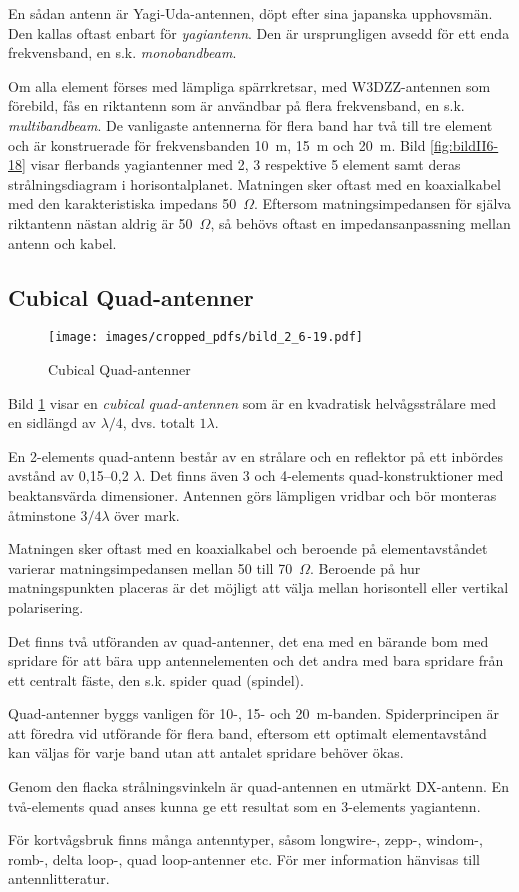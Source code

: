 En sådan antenn är Yagi-Uda-antennen, döpt efter sina japanska upphovsmän.
Den kallas oftast enbart för \emph{yagiantenn}.
Den är ursprungligen avsedd för ett enda frekvensband, en s.k.
\emph{monobandbeam}.

Om alla element förses med lämpliga spärrkretsar, med W3DZZ-antennen som
förebild, fås en riktantenn som är användbar på flera frekvensband, en s.k.
\emph{multibandbeam}.
De vanligaste antennerna för flera band har två till tre element och är
konstruerade för frekvensbanden 10~m, 15~m och 20~m.
Bild \ref{fig:bildII6-18} visar flerbands yagiantenner med 2, 3 respektive 5
element samt deras strålningsdiagram i horisontalplanet.
Matningen sker oftast med en koaxialkabel med den karakteristiska impedans 50~\(\Omega\).
Eftersom matningsimpedansen för själva riktantenn nästan aldrig är
50~\(\Omega\), så behövs oftast en impedansanpassning mellan antenn och kabel.

\subsection{Cubical Quad-antenner}

\begin{figure}
  \texttt{[image: images/cropped\_pdfs/bild\_2\_6-19.pdf]}
  \caption{Cubical Quad-antenner}
  \label{fig:bildII6-19}
\end{figure}

Bild \ref{fig:bildII6-19} visar en \emph{cubical quad-antennen} som är en
kvadratisk helvågsstrålare med en sidlängd av \(\lambda/4\), dvs. totalt
\(1\lambda\).

En 2-elements quad-antenn består av en strålare och en reflektor på
ett inbördes avstånd av 0,15--0,2 \(\lambda\).
Det finns även 3 och 4-elements quad-konstruktioner med beaktansvärda
dimensioner.
Antennen görs lämpligen vridbar och bör monteras åtminstone \(3/4 \lambda\)
över mark.

Matningen sker oftast med en koaxialkabel och beroende på elementavståndet
varierar matningsimpedansen mellan 50 till 70~\(\Omega\).
Beroende på hur matningspunkten placeras är det möjligt att välja mellan
horisontell eller vertikal polarisering.

Det finns två utföranden av quad-antenner, det ena med en bärande bom
med spridare för att bära upp antennelementen och det andra med bara
spridare från ett centralt fäste, den s.k. spider quad (spindel).

Quad-antenner byggs vanligen för 10-, 15- och 20~m-banden.
Spiderprincipen är att föredra vid utförande för flera band, eftersom ett
optimalt elementavstånd kan väljas för varje band utan att antalet spridare
behöver ökas.

Genom den flacka strålningsvinkeln är quad-antennen en utmärkt DX-antenn.
En två-elements quad anses kunna ge ett resultat som en 3-elements yagiantenn.

För kortvågsbruk finns många antenntyper, såsom longwire-, zepp-,
windom-, romb-, delta loop-, quad loop-antenner etc. För mer
information hänvisas till antennlitteratur.
